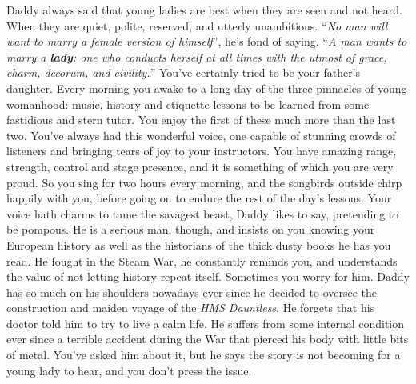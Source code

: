 \documentclass[char]{airship}
\begin{document}
\name{\cThief{}}


Daddy always said that young ladies are best when they are seen and
not heard. When they are quiet, polite, reserved, and utterly
unambitious. ``{\it No man will want to marry a female version of
himself}'', he's fond of saying. ``{\it A man wants to marry a {\bf
lady}: one who conducts herself at all times with the utmost of grace,
charm, decorum, and civility.}'' You've certainly tried to be your
father's daughter. Every morning you awake to a long day of the three
pinnacles of young womanhood: music, history and etiquette lessons to
be learned from some fastidious and stern tutor. You enjoy the first
of these much more than the last two. You've always had this wonderful
voice, one capable of stunning crowds of listeners and bringing tears
of joy to your instructors. You have amazing range, strength, control
and stage presence, and it is something of which you are very
proud. So you sing for two hours every morning, and the songbirds
outside chirp happily with you, before going on to endure the rest of
the day's lessons. Your voice hath charms to tame the savagest beast,
Daddy likes to say, pretending to be pompous. He is a serious man,
though, and insists on you knowing your European history as well as
the historians of the thick dusty books he has you read. He fought in
the Steam War, he constantly reminds you, and understands the value of
not letting history repeat itself. Sometimes you worry for him. Daddy
has so much on his shoulders nowadays ever since he decided to oversee
the construction and maiden voyage of the {\it HMS Dauntless}. He
forgets that his doctor told him to try to live a calm life. He
suffers from some internal condition ever since a terrible accident
during the War that pierced his body with little bits of metal. You've
asked him about it, but he says the story is not becoming for a young
lady to hear, and you don't press the issue.
\end{document}
